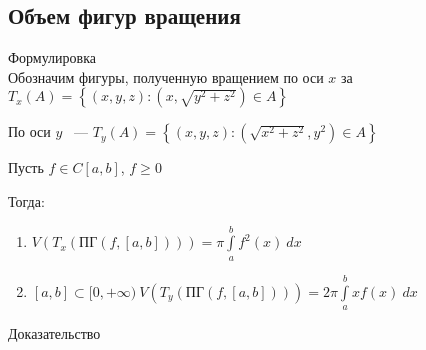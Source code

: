 \documentclass[../main.tex]{subfiles}
\begin{document}
\subsection{Объем фигур вращения}
Формулировка 
$$$$
            Обозначим фигуры, полученную вращением по оси $x$ за $T_x(A) = \left\{ (x, y, z) : (x, \sqrt{y^2 + z^2}) \in A \right\}$
        
            По оси $y$ ~--- $T_y(A) = \left\{ (x, y, z) : (\sqrt{x^2 + z^2}, y^2) \in A \right\}$
        
            Пусть $f \in C[a, b]$, $f \geq 0$
            
            Тогда:
            
            \begin{enumerate}
            
                \item $V(T_x(\text{ПГ}(f, [a, b]))) = \pi \int\limits^b_a f^2(x) \ dx$
                
                \item $[a, b] \subset [0, +\infty) \ V(T_y(\text{ПГ}(f, [a, b]))) = 2 \pi \int\limits^b_a x f(x) \ dx$
                
            \end{enumerate}
      
$$$$      
Доказательство 
$$$$
        
\end{document}
